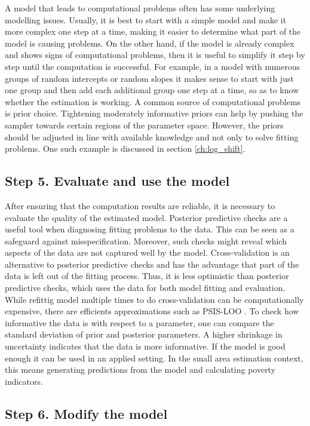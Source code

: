 A model that leads to computational problems often has some underlying modelling issues.
Usually, it is best to start with a simple model and make it more complex one step at a time, making it easier to determine what part of the model is causing problems.
On the other hand, if the model is already complex and shows signs of computational problems, then it is useful to simplify it step by step until the computation is successful.
For example, in a model with numerous groups of random intercepts or random slopes it makes sense to start with just one group and then add each additional group one step at a time, so as to know whether the estimation is working.
A common source of computational problems is prior choice.
Tightening moderately informative priors can help by pushing the sampler towards certain regions of the parameter space.
However, the priors should be adjusted in line with available knowledge and not only to solve fitting problems.
One such example is discussed in section \ref{ch:log_shift}.

\subsection{Step 5. Evaluate and use the model}

After ensuring that the computation results are reliable, it is necessary to evaluate the quality of the estimated model.
Posterior predictive checks are a useful tool when diagnosing fitting problems to the data.
This can be seen as a safeguard against misspecification.
Moreover, such checks might reveal which aspects of the data are not captured well by the model.
Cross-validation is an alternative to posterior predictive checks and has the advantage that part of the data is left out of the fitting process.
Thus, it is less optimistic than posterior predictive checks, which uses the data for both model fitting and evaluation.
While refittig model multiple times to do cross-validation can be computationally expensive, there are efficients approximations such as PSIS-LOO \citep{vehtari_practical_2017}.
To check how informative the data is with respect to a parameter, one can compare the standard deviation of prior and posterior parameters. A higher shrinkage in uncertainty indicates that the data is more informative.
If the model is good enough it can be used in an applied setting.
In the small area estimation context, this means generating predictions from the model and calculating poverty indicators.

\subsection{Step 6. Modify the model}


